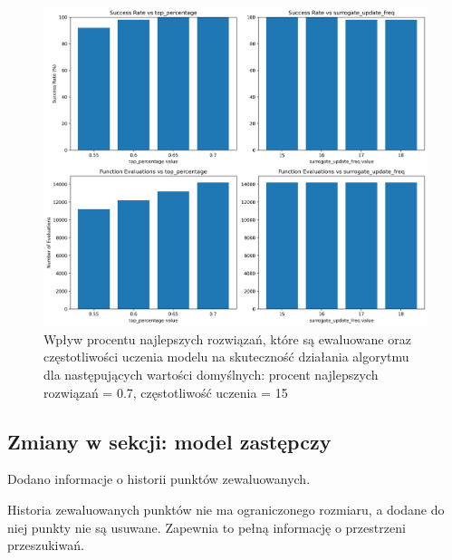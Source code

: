 \documentclass{article}
\begin{document}
\begin{figure}[H]
    \centering
    \includegraphics[width=\textwidth]{surrogate_de_parameter_tuning_results3.png}
    \caption{Wpływ procentu najlepszych rozwiązań, które są ewaluowane oraz częstotliwości uczenia modelu na skuteczność działania algorytmu dla następujących wartości domyślnych: procent najlepszych rozwiązań = 0.7, częstotliwość uczenia = 15}
    \label{fig:surogate_de_parameter_results3}
\end{figure}


\subsection{Zmiany w sekcji: model zastępczy}

Dodano informacje o historii punktów zewaluowanych.

Historia zewaluowanych punktów nie ma ograniczonego rozmiaru, a dodane do niej punkty nie są usuwane. Zapewnia to pełną informację o przestrzeni przeszukiwań.
\end{document}
